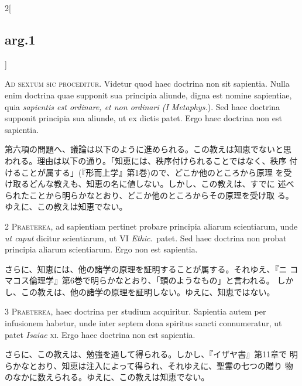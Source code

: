 \documentclass[
paper=a4paper,
fontsize=10pt,
jafontsize=9pt,
titlepage
]{jlreq}
\begin{document}
\begin{paracol}{2}[\subsection{arg.1}]

{\Huge A}{\scshape d sextum sic proceditur}. Videtur quod haec
doctrina non sit sapientia. Nulla enim doctrina quae supponit sua
principia aliunde, digna est nomine sapientiae, quia {\itshape
sapientis est ordinare, et non ordinari (I Metaphys.}). Sed haec
doctrina supponit principia sua aliunde, ut ex dictis patet. Ergo haec
doctrina non est sapientia.

\switchcolumn

第六項の問題へ、議論は以下のように進められる。この教えは知恵でないと思
われる。理由は以下の通り。「知恵には、秩序付けられることではなく、秩序
付けることが属する」(『形而上学』第1巻)ので、どこか他のところから原理
を受け取るどんな教えも、知恵の名に値しない。しかし、この教えは、すでに
述べられたことから明らかなとおり、どこか他のところからその原理を受け取
る。ゆえに、この教えは知恵でない。


{\scshape 2 Praeterea}, ad sapientiam pertinet probare principia
aliarum scientiarum, unde {\itshape ut caput} dicitur scientiarum, ut
VI {\itshape Ethic}.~patet. Sed haec doctrina non probat principia
aliarum scientiarum. Ergo non est sapientia.

\switchcolumn

さらに、知恵には、他の諸学の原理を証明することが属する。それゆえ、『ニ
コマコス倫理学』第6巻で明らかなとおり、「頭のようなもの」と言われる。
しかし、この教えは、他の諸学の原理を証明しない。ゆえに、知恵ではない。


{\scshape 3 Praeterea}, haec doctrina per studium
acquiritur. Sapientia autem per infusionem habetur, unde inter septem
dona spiritus sancti connumeratur, ut patet {\itshape Isaiae}
{\scshape xi}. Ergo haec doctrina non est sapientia.

\switchcolumn

さらに、この教えは、勉強を通して得られる。しかし、『イザヤ書』第11章で
明らかなとおり、知恵は注入によって得られ、それゆえに、聖霊の七つの贈り
物のなかに数えられる。ゆえに、この教えは知恵でない。


\end{paracol}
\end{document}
